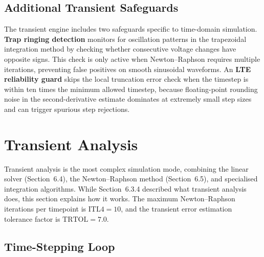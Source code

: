 \subsection{Additional Transient Safeguards}

The transient engine includes two safeguards specific to time-domain simulation. \textbf{Trap ringing detection} monitors for oscillation patterns in the trapezoidal integration method by checking whether consecutive voltage changes have opposite signs. This check is only active when Newton--Raphson requires multiple iterations, preventing false positives on smooth sinusoidal waveforms. An \textbf{LTE reliability guard} skips the local truncation error check when the timestep is within ten times the minimum allowed timestep, because floating-point rounding noise in the second-derivative estimate dominates at extremely small step sizes and can trigger spurious step rejections.

\section{Transient Analysis}

Transient analysis is the most complex simulation mode, combining the linear solver (Section~6.4), the Newton--Raphson method (Section~6.5), and specialised integration algorithms. While Section~6.3.4 described what transient analysis does, this section explains how it works. The maximum Newton--Raphson iterations per timepoint is $\text{ITL4} = 10$, and the transient error estimation tolerance factor is $\text{TRTOL} = 7.0$.

\subsection{Time-Stepping Loop}

